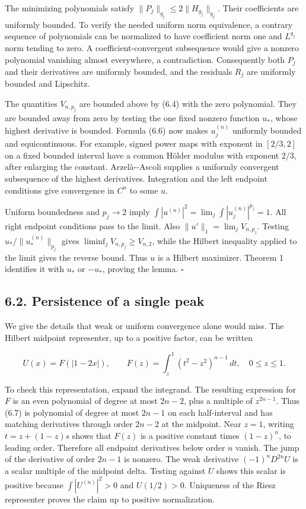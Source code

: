 \documentclass[11pt]{article}
\begin{document}
The minimizing polynomials satisfy
\(\|P_j\|_{q_j}\le2\|H_{g_j}\|_{q_j}\). Their coefficients are uniformly
bounded. To verify the needed uniform norm equivalence, a contrary
sequence of polynomials can be normalized to have coefficient norm one
and \(L^{q_j}\) norm tending to zero. A coefficient-convergent
subsequence would give a nonzero polynomial vanishing almost everywhere,
a contradiction. Consequently both \(P_j\) and their derivatives are
uniformly bounded, and the residuals \(R_j\) are uniformly bounded and
Lipschitz.

The quantities \(V_{n,p_j}\) are bounded above by (6.4) with the zero
polynomial. They are bounded away from zero by testing the one fixed
nonzero function \(u_*\), whose highest derivative is bounded. Formula
(6.6) now makes \(u_j^{(n)}\) uniformly bounded and equicontinuous. For
example, signed power maps with exponent in \([2/3,2]\) on a fixed
bounded interval have a common Hölder modulus with exponent \(2/3\),
after enlarging the constant. Arzelà-\/-Ascoli supplies a uniformly
convergent subsequence of the highest derivatives. Integration and the
left endpoint conditions give convergence in \(C^n\) to some \(u\).

Uniform boundedness and \(p_j\to2\) imply
\(\int |u^{(n)}|^2=\lim_j\int|u_j^{(n)}|^{p_j}=1\). All right endpoint
conditions pass to the limit. Also \(\|u'\|_1=\lim_jV_{n,p_j}\). Testing
\(u_*/\|u_*^{(n)}\|_{p_j}\) gives \(\liminf_j V_{n,p_j}\ge V_{n,2}\),
while the Hilbert inequality applied to the limit gives the reverse
bound. Thus \(u\) is a Hilbert maximizer. Theorem 1 identifies it with
\(u_*\) or \(-u_*\), proving the lemma. \(\square\)

\subsection{6.2. Persistence of a single
peak}\label{persistence-of-a-single-peak}

We give the details that weak or uniform convergence alone would miss.
The Hilbert midpoint representer, up to a positive factor, can be
written

\[
U(x)=F(|1-2x|),\qquad
F(z)=\int_z^1(t^2-z^2)^{n-1}\,dt,
\quad 0\le z\le1.
\tag{6.7}
\]

To check this representation, expand the integrand. The resulting
expression for \(F\) is an even polynomial of degree at most \(2n-2\),
plus a multiple of \(z^{2n-1}\). Thus (6.7) is polynomial of degree at
most \(2n-1\) on each half-interval and has matching derivatives through
order \(2n-2\) at the midpoint. Near \(z=1\), writing \(t=z+(1-z)s\)
shows that \(F(z)\) is a positive constant times \((1-z)^n\), to leading
order. Therefore all endpoint derivatives below order \(n\) vanish. The
jump of the derivative of order \(2n-1\) is nonzero. The weak derivative
\((-1)^nD^{2n}U\) is a scalar multiple of the midpoint delta. Testing
against \(U\) shows this scalar is positive because
\(\int|U^{(n)}|^2>0\) and \(U(1/2)>0\). Uniqueness of the Riesz
representer proves the claim up to positive normalization.
\end{document}
